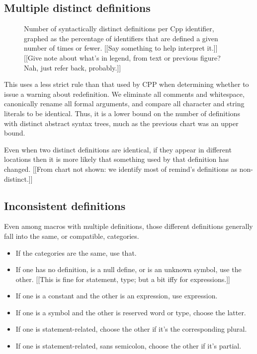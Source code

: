 \documentclass[10pt]{article}
\newcommand{\pkg}[1]{\textsf{#1}}
\begin{document}
\subsection{Multiple distinct definitions}

\begin{figure}
  \centerline{}
  \caption{Number of syntactically distinct definitions per Cpp identifier, graphed as
    the percentage of identifiers that are defined a given number of times
    or fewer.  [[Say something to help interpret it.]]  [[Give note
    about what's in legend, from text or previous figure?  Nah, just
    refer back, probably.]]}
  \label{fig:freq-ddf-cat}
\end{figure}
        
This uses a less strict rule than that used by CPP when determining whether
to issue a warning about redefinition.  We eliminate all comments and
whitespace, canonically rename all formal arguments, and compare all
character and string literals to be identical.  Thus, it is a lower bound
on the number of definitions with distinct abstract syntax trees, much as
the previous chart was an upper bound.

Even when two distinct definitions are identical, if they appear in
different locations then it is more likely that something used by that
definition has changed.  [[From chart not shown: we identify most of
\pkg{remind}'s definitions as non-distinct.]]

\subsection{Inconsistent definitions}
\label{sec:inconsistent}

Even among macros with multiple definitions, those different definitions
generally fall into the same, or compatible, categories.

\begin{itemize}
\item If the categories are the same, use that.

\item If one has no definition, is a null define, or is an unknown symbol, use
  the other.  [[This is fine for statement, type; but a bit iffy for
  expressions.]]

\item If one is a constant and the other is an expression, use expression.

\item If one is a symbol and the other is reserved word or type, choose the latter.

\item If one is statement-related, choose the other if it's the corresponding plural.
\item If one is statement-related, sans semicolon, choose the other if it's partial.
\end{itemize}
\end{document}
